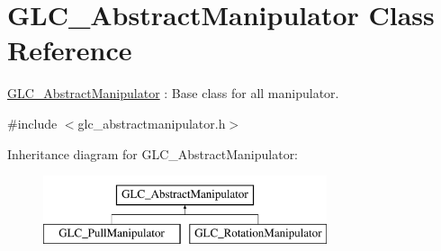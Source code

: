 \hypertarget{class_g_l_c___abstract_manipulator}{\section{G\-L\-C\-\_\-\-Abstract\-Manipulator Class Reference}
\label{class_g_l_c___abstract_manipulator}
}


\hyperlink{class_g_l_c___abstract_manipulator}{G\-L\-C\-\_\-\-Abstract\-Manipulator} \-: Base class for all manipulator.  




{\ttfamily \#include $<$glc\-\_\-abstractmanipulator.\-h$>$}

Inheritance diagram for G\-L\-C\-\_\-\-Abstract\-Manipulator\-:\begin{figure}[H]
\begin{center}
\leavevmode
\includegraphics[height=2.000000cm]{class_g_l_c___abstract_manipulator}
\end{center}
\end{figure}
